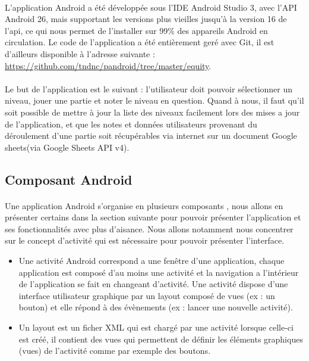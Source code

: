 \documentclass[a4paper, 10pt]{article}
\begin{document}
	\paragraph{}L'application Android a été développée sous l'IDE Android Studio 3, avec l'API Android 26, mais supportant les versions plus vieilles jusqu'à la version 16 de l'api, ce qui nous permet de l'installer sur 99\% des appareils Android en circulation. Le code de l'application a été entièrement geré avec Git, il est d'ailleurs  disponible à l'adresse suivante :  \url{https://github.com/tndnc/pandroid/tree/master/equity}. 
	\paragraph{}Le but de l'application est le suivant : l'utilisateur doit pouvoir sélectionner un niveau, jouer une partie et noter le niveau en question. Quand à nous, il faut qu'il soit possible de mettre à jour la liste des niveaux facilement lors des mises a jour de l'application, et que les notes et données utilisateurs provenant du déroulement d'une partie soit récupérables via internet sur un document Google sheets(via Google Sheets API v4).  
	
	\subsection{Composant Android}
	\paragraph{} Une application Android s'organise en plusieurs composants , nous allons en présenter certains dans la section suivante pour pouvoir présenter l'application et ses fonctionnalités avec plus d'aisance. Nous allons notamment nous concentrer sur le concept d'activité qui est nécessaire pour pouvoir présenter l'interface.
\hfill \break
\begin{itemize}
	\item Une activité Android correspond a une fenêtre d'une application, chaque application est composé d'au moins une activité et la navigation a l'intérieur de l'application se fait en changeant d'activité. Une activité dispose d'une interface utilisateur graphique  par un layout composé de vues (ex : un bouton) et elle répond à des évènements (ex : lancer une nouvelle activité).
	\item Un layout est un ficher XML qui est chargé par une activité lorsque celle-ci est créé, il contient des vues qui permettent de définir les éléments graphiques (vues) de l'activité comme par exemple des boutons.
\end{itemize}
\end{document}
